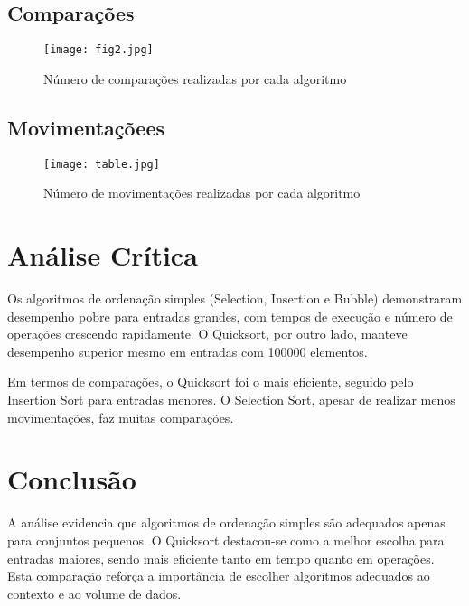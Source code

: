 \documentclass[12pt]{article}
\begin{document}
\subsection{Comparações}
\begin{figure}[H]
\centering
\texttt{[image: fig2.jpg]}
\caption{Número de comparações realizadas por cada algoritmo}
\end{figure}

\subsection{Movimentaçõees}
\begin{figure}[H]
\centering
\texttt{[image: table.jpg]}
\caption{Número de movimentações realizadas por cada algoritmo}
\end{figure}


\section{Análise Crítica}

Os algoritmos de ordenação simples (Selection, Insertion e Bubble) demonstraram desempenho pobre para entradas grandes, com tempos de execução e número de operações crescendo rapidamente. O Quicksort, por outro lado, manteve desempenho superior mesmo em entradas com 100000 elementos.

Em termos de comparações, o Quicksort foi o mais eficiente, seguido pelo Insertion Sort para entradas menores. O Selection Sort, apesar de realizar menos movimentações, faz muitas comparações.

\section{Conclusão}

A análise evidencia que algoritmos de ordenação simples são adequados apenas para conjuntos pequenos. O Quicksort destacou-se como a melhor escolha para entradas maiores, sendo mais eficiente tanto em tempo quanto em operações. Esta comparação reforça a importância de escolher algoritmos adequados ao contexto e ao volume de dados.
\end{document}

